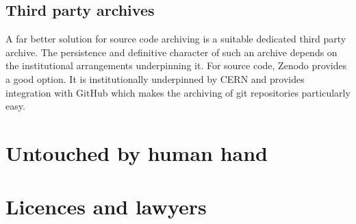 \documentclass[a4paper,11pt]{article}
\begin{document}
\subsection{Third party archives}

A far better solution for source code archiving is a suitable dedicated
third party archive. The persistence and definitive character of such an
archive depends on the institutional arrangements underpinning it. For
source code, Zenodo provides a good option. It is institutionally
underpinned by CERN and provides integration with GitHub which makes the
archiving of git repositories particularly easy. 

\section{Untouched by human hand}

\section{Licences and lawyers}
\end{document}

